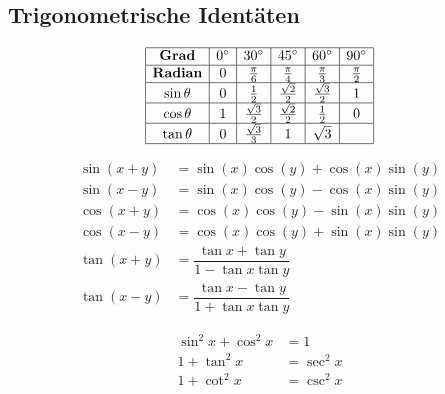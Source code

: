 \documentclass[main.tex]{subfiles}
\begin{document}
\subsection{Trigonometrische Identäten}

\begin{Theorem}
    $$\begin{array}{|c|c|c|c|c|c|c|c|}
      \hline
      \textbf{Grad}
        & 0^{\circ} & 30^{\circ} & 45^{\circ} & 60^{\circ} & 90^{\circ} \\
      \hline
      \textbf{Radian}
        & 0 & \frac{\pi}{6} & \frac{\pi}{4} & \frac{\pi}{3} & \frac{\pi}{2} \\
      \hline
      \sin \theta
        & 0 & \frac{1}{2} & \frac{\sqrt 2}{2} & \frac{\sqrt 3}{2} & 1\\
      \hline
      \cos \theta
        & 1 & \frac{\sqrt 3}{2} & \frac{\sqrt 2}{2} & \frac{1}{2} & 0\\
      \hline
      \tan \theta
        & 0 & \frac{\sqrt 3}{3} & 1& \sqrt 3 & \\
      \hline
    \end{array}$$
\end{Theorem}

\begin{Theorem}[Additionstheoreme]
  $$\begin{aligned}
    \sin(x + y) &= \sin (x) \cos (y) + \cos (x) \sin (y)\\
    \sin(x - y) &= \sin (x) \cos (y) - \cos (x) \sin (y)\\
    \cos(x + y) &= \cos (x) \cos (y) - \sin (x) \sin (y)\\
    \cos(x - y) &= \cos (x) \cos (y) + \sin (x) \sin (y)\\
    \tan(x + y) &= \dfrac{\tan x + \tan y}{1 - \tan x \tan y}\\
    \tan(x - y) &= \dfrac{\tan x - \tan y}{1 + \tan x \tan y}
  \end{aligned}$$
\end{Theorem}

\begin{Theorem}
  $$\begin{aligned}
    \sin^2 x + \cos^2 x &= 1\\
    1 + \tan^2 x &= \sec^2 x\\
    1 + \cot^2 x &= \csc^2 x
  \end{aligned}$$
\end{Theorem}
\end{document}
